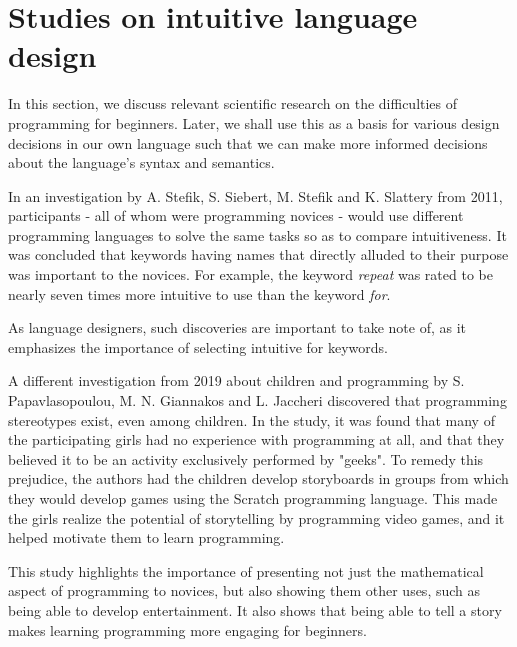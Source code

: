 \section{Studies on intuitive language design} \label{sec:scientific_research} 
In this section, we discuss relevant scientific research on the difficulties of programming for beginners.
Later, we shall use this as a basis for various design decisions in our own language such that we can make more 
informed decisions about the language's syntax and semantics.

In an investigation by A. Stefik, S. Siebert, M. Stefik and K. Slattery from 2011, participants - all of whom were
programming novices - would use different programming languages to solve the same tasks so as to compare intuitiveness. 
It was concluded that keywords having names that directly alluded to their purpose was important to the novices. 
For example, the keyword \emph{repeat} was rated to be nearly seven times more intuitive to use than the keyword \emph{for}\cite{stefik_empirical_2011}.

\noindent
As language designers, such discoveries are important to take note of, as it emphasizes the importance of selecting intuitive for keywords.

A different investigation from 2019 about children and programming by S. Papavlasopoulou, M. N. Giannakos and L. Jaccheri discovered that 
programming stereotypes exist, even among children. 
In the study, it was found that many of the participating girls had no experience with programming at all, and that they believed it 
to be an activity exclusively performed by "geeks". 
To remedy this prejudice, the authors had the children develop storyboards in groups from which they would develop games using the 
Scratch programming language. 
This made the girls realize the potential of storytelling by programming video games, and it helped motivate them to learn programming\cite{papavlasopoulou_exploring_2019}.

\noindent
This study highlights the importance of presenting not just the mathematical aspect of programming to novices, but also 
showing them other uses, such as being able to develop entertainment. 
It also shows that being able to tell a story makes learning programming more engaging for beginners.


